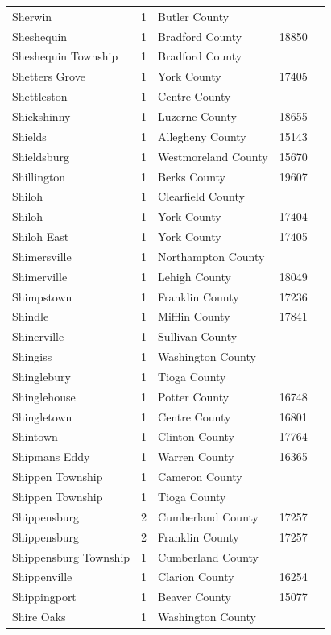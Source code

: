 \documentclass{article}
\begin{document}
\begin{tabular}{lllll}
Sherwin & 1 & Butler County &  &  \\
Sheshequin & 1 & Bradford County & 18850 &  \\
Sheshequin Township & 1 & Bradford County &  &  \\
Shetters Grove & 1 & York County & 17405 &  \\
Shettleston & 1 & Centre County &  &  \\
Shickshinny & 1 & Luzerne County & 18655 &  \\
Shields & 1 & Allegheny County & 15143 &  \\
Shieldsburg & 1 & Westmoreland County & 15670 &  \\
Shillington & 1 & Berks County & 19607 &  \\
Shiloh & 1 & Clearfield County &  &  \\
Shiloh & 1 & York County & 17404 &  \\
Shiloh East & 1 & York County & 17405 &  \\
Shimersville & 1 & Northampton County &  &  \\
Shimerville & 1 & Lehigh County & 18049 &  \\
Shimpstown & 1 & Franklin County & 17236 &  \\
Shindle & 1 & Mifflin County & 17841 &  \\
Shinerville & 1 & Sullivan County &  &  \\
Shingiss & 1 & Washington County &  &  \\
Shinglebury & 1 & Tioga County &  &  \\
Shinglehouse & 1 & Potter County & 16748 &  \\
Shingletown & 1 & Centre County & 16801 &  \\
Shintown & 1 & Clinton County & 17764 &  \\
Shipmans Eddy & 1 & Warren County & 16365 &  \\
Shippen Township & 1 & Cameron County &  &  \\
Shippen Township & 1 & Tioga County &  &  \\
Shippensburg & 2 & Cumberland County & 17257 &  \\
Shippensburg & 2 & Franklin County & 17257 &  \\
Shippensburg Township & 1 & Cumberland County &  &  \\
Shippenville & 1 & Clarion County & 16254 &  \\
Shippingport & 1 & Beaver County & 15077 &  \\
Shire Oaks & 1 & Washington County &  &  \\

\end{tabular}
\end{document}
